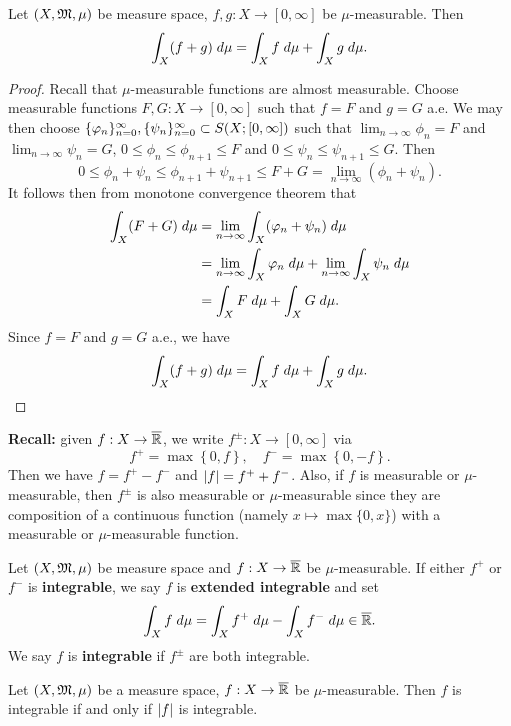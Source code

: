 \documentclass[a4paper]{article}
\begin{document}
\begin{thm}
Let $(X, \mathfrak{M}, \mu)$ be measure space, $f, g : X \to [0, \infty]$
be $\mu$-measurable. Then 
\[
\int_X (f + g) \; d \mu = \int_X f \; d \mu + \int_X g \; d \mu.
\]
\end{thm}

\begin{proof}
Recall that $\mu$-measurable functions are almost 
measurable. Choose measurable functions 
$F, G : X \to [0, \infty]$ such that $f = F$
and $g = G$ a.e. We may then choose 
$\{ \varphi_n \}_{n=0}^\infty, \{ \psi_n \}_{n=0}^\infty \subset S(X; [0, \infty])$
such that $\lim_{n \to \infty} \phi_n = F$
and $\lim_{n \to \infty} \psi_n = G$, 
$0 \leq \phi_n \leq \phi_{n+1} \leq F$
and $0 \leq \psi_n \leq \psi_{n+1} \leq G$. 
Then 
\[
0 \leq \phi_n + \psi_n \leq \phi_{n+1} + \psi_{n+1} 
\leq F + G = \lim_{n \to \infty} (\phi_n + \psi_n).
\]
It follows then from monotone convergence theorem that 
\[
\begin{aligned}
\int_X (F + G) \; d \mu 
&= \lim_{n \to \infty} \int_X (\varphi_n + \psi_n) \; d \mu \\
&= \lim_{n \to \infty} \int_X \varphi_n \; d \mu 
+ \lim_{n \to \infty} \int_X \psi_n \; d \mu \\ 
&= \int_X F \; d \mu + \int_X G \; d \mu.
\end{aligned}
\]
Since $f = F$ and $g = G$ a.e., we have 
\[
\int_X (f + g) \; d \mu = \int_X f \; d \mu + \int_X g \; d \mu.
\]
\end{proof}

\textbf{Recall:} given $f: X \to \overline{\mathbb{R}}$, 
we write $f^{\pm} : X \to [0, \infty]$ via 
\[
f^+ = \max\left\{ 0, f \right\}, \quad 
f^- = \max\left\{ 0, -f \right\}.
\]
Then we have $f = f^+ - f^-$ and 
$\left\lvert f\right\rvert = f^+ + f^-$. Also, if $f$ is measurable or 
$\mu$-measurable, then $f^\pm$ is also measurable or
$\mu$-measurable since they are composition of a 
continuous function (namely $x \mapsto \max \{0, x\}$)
with a measurable or $\mu$-measurable
function.

\begin{defi}
Let $(X, \mathfrak{M}, \mu)$ be measure space and 
$f : X \to \overline{\mathbb{R}}$ be $\mu$-measurable. 
If either $f^+$ or $f^-$ is \textbf{integrable}, 
we say $f$ is \textbf{extended integrable} and 
set 
\[
\int_X f \; d \mu = \int_X f^+ \; d \mu - \int_X f^- \; d \mu
\in \overline{\mathbb{R}}.
\]
We say $f$ is \textbf{integrable} if $f^\pm$ are both 
integrable.
\end{defi}

\begin{prop}
Let $(X, \mathfrak{M}, \mu)$ be a measure space, $f : X \to \overline{\mathbb{R}}$
be $\mu$-measurable. Then $f$ is integrable 
if and only if $\left\lvert f\right\rvert$ is integrable.
\end{prop}
\end{document}
